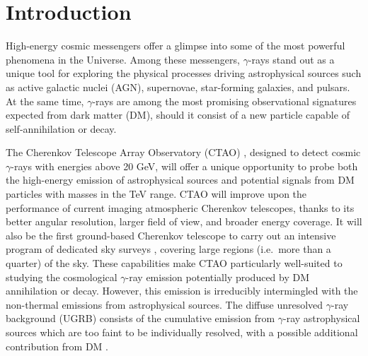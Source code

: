 \documentclass[aps,prd,a4paper,reprint,nofootinbib,superscriptaddress,floatfix,preprintnumbers]{revtex4-2}
\begin{document}
\maketitle

\section{Introduction}\label{sec:Intro}

{High-energy cosmic messengers offer a glimpse into some of the most powerful phenomena in the Universe. Among these messengers, $\gamma$-rays stand out as a unique tool for exploring the physical processes driving astrophysical sources such as active galactic nuclei (AGN), supernovae, star-forming galaxies, and pulsars. At the same time, $\gamma$-rays are among the most promising observational signatures expected from dark matter (DM), should it consist of a new particle capable of self-annihilation or decay.}

The Cherenkov Telescope Array Observatory (CTAO) \cite{CTAConsortium:2017dvg,mazin2019cherenkov}, designed to detect cosmic $\gamma$-rays with energies above 20 GeV, will offer a unique opportunity to probe both the high-energy emission of astrophysical sources and potential signals from DM particles with masses in the TeV range. CTAO will improve upon the performance of current imaging atmospheric Cherenkov telescopes, thanks to its better angular resolution, larger field of view, and broader energy coverage. It will also be the first ground-based Cherenkov telescope to carry out an intensive program of dedicated sky surveys {\cite{CTAConsortium:2017dvg,mazin2019cherenkov}}, covering large regions (i.e.\ more than a quarter) of the sky. These capabilities make CTAO particularly well-suited to studying the cosmological $\gamma$-ray emission potentially produced by DM annihilation or decay. However, this emission is irreducibly intermingled with the non-thermal emissions from astrophysical sources. The diffuse unresolved $\gamma$-ray background \cite{DGRB-review} (UGRB) consists of the cumulative emission from $\gamma$-ray astrophysical sources which are too faint to be individually resolved, with a possible additional contribution from DM \cite{Ajello:2015mfa}.
\end{document}
